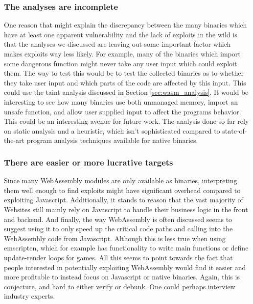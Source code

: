 \documentclass[sigconf]{acmart}
\begin{document}
\subsubsection{The analyses are incomplete}
\label{sec:analyses_incomplete}
One reason that might explain the discrepancy between the many binaries which have at least one apparent vulnerability and the lack of exploits in the wild is that the analyses we discussed are leaving out some important factor which makes exploits way less likely. For example, many of the binaries which import some dangerous function might never take any user input which could exploit them. The way to test this would be to test the collected binaries as to whether they take user input and which parts of the code are affected by this input. This could use the taint analysis discussed in Section \ref{sec:wasm_analysis}. It would be interesting to see how many binaries use both unmanaged memory, import an unsafe function, and allow user supplied input to affect the programs behavior. This could be an interesting avenue for future work. The analysis done so far rely on static analysis and a heuristic, which isn't sophisticated compared to state-of-the-art program analysis techniques available for native binaries.

\subsubsection{There are easier or more lucrative targets}
\label{sec:better_targets}
Since many WebAssembly modules are only available as binaries, interpreting them well enough to find exploits might have significant overhead compared to exploiting Javascript. Additionally, it stands to reason that the vast majority of Websites still mainly rely on Javascript to handle their business logic in the front and backend. And finally, the way WebAssembly is often discussed seems to suggest using it to only speed up the critical code paths and calling into the WebAssembly code from Javascript. Although this is less true when using emscripten, which for example has functionality to write main functions or define update-render loops for games. All this seems to point towards the fact that people interested in potentially exploiting WebAssembly would find it easier and more profitable to instead focus on Javascript or native binaries. Again, this is conjecture, and hard to either verify or debunk. One could perhaps interview industry experts.
\end{document}
